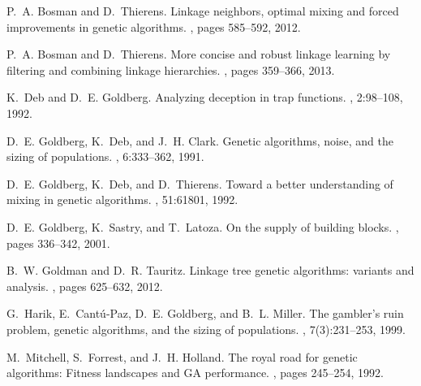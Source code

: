 \documentclass{sig-alternate}
\begin{document}
\begin{thebibliography}{10}

P.~A. Bosman and D.~Thierens.
\newblock Linkage neighbors, optimal mixing and forced improvements in genetic
  algorithms.
, pages 585--592, 2012.

P.~A. Bosman and D.~Thierens.
\newblock More concise and robust linkage learning by filtering and combining
  linkage hierarchies.
, pages 359--366, 2013.

K.~Deb and D.~E. Goldberg.
\newblock Analyzing deception in trap functions.
, 2:98--108, 1992.

D.~E. Goldberg, K.~Deb, and J.~H. Clark.
\newblock Genetic algorithms, noise, and the sizing of populations.
, 6:333--362, 1991.

D.~E. Goldberg, K.~Deb, and D.~Thierens.
\newblock Toward a better understanding of mixing in genetic algorithms.
, 51:61801, 1992.

D.~E. Goldberg, K.~Sastry, and T.~Latoza.
\newblock On the supply of building blocks.
, pages 336--342, 2001.

\vfill\eject

B.~W. Goldman and D.~R. Tauritz.
\newblock Linkage tree genetic algorithms: variants and analysis.
, pages 625--632, 2012.

G.~Harik, E.~Cant{\'u}-Paz, D.~E. Goldberg, and B.~L. Miller.
\newblock The gambler's ruin problem, genetic algorithms, and the sizing of
  populations.
, 7(3):231--253, 1999.

M.~Mitchell, S.~Forrest, and J.~H. Holland.
\newblock The royal road for genetic algorithms: Fitness landscapes and {GA}
  performance.
, pages 245--254, 1992.


\end{thebibliography}
\end{document}
